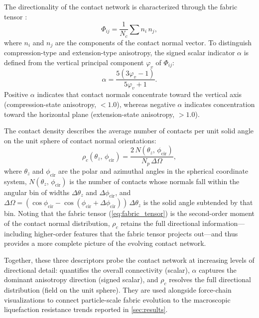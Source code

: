 The directionality of the contact network is characterized through the fabric tensor \citep{Oda1982fabric,Oda1982stat}:
\begin{equation}
\Phi_{ij} = \frac{1}{N_c}\sum n_i\,n_j,
\label{eq:fabric_tensor}
\end{equation}
where $n_i$ and $n_j$ are the components of the contact normal vector. To distinguish compression-type and extension-type anisotropy, the signed scalar indicator $\alpha$ \citep{YimsiriSoga2010,Otsubo2022} is defined from the vertical principal component $\varphi_v$ of $\Phi_{ij}$:
\begin{equation}
\alpha = \frac{5(3\varphi_v - 1)}{5\varphi_v + 1}.
\label{eq:alpha_definition_method}
\end{equation}
Positive $\alpha$ indicates that contact normals concentrate toward the vertical axis (compression-state anisotropy, \Kzero{} $< 1.0$), whereas negative $\alpha$ indicates concentration toward the horizontal plane (extension-state anisotropy, \Kzero{} $> 1.0$).

The contact density \citep{Han2023} describes the average number of contacts per unit solid angle on the unit sphere of contact normal orientations:
\begin{equation}
\rho_c(\theta_z,\,\phi_{\mathrm{cir}}) = \frac{2\,N(\theta_z,\,\phi_{\mathrm{cir}})}{N_p\,\Delta\Omega},
\label{eq:contact_density}
\end{equation}
where $\theta_z$ and $\phi_{\mathrm{cir}}$ are the polar and azimuthal angles in the spherical coordinate system, $N(\theta_z,\,\phi_{\mathrm{cir}})$ is the number of contacts whose normals fall within the angular bin of widths $\Delta\theta_z$ and $\Delta\phi_{\mathrm{cir}}$, and $\Delta\Omega = (\cos\phi_{\mathrm{cir}} - \cos(\phi_{\mathrm{cir}}+\Delta\phi_{\mathrm{cir}}))\,\Delta\theta_z$ is the solid angle subtended by that bin. Noting that the fabric tensor (\cref{eq:fabric_tensor}) is the second-order moment of the contact normal distribution, $\rho_c$ retains the full directional information---including higher-order features that the fabric tensor projects out---and thus provides a more complete picture of the evolving contact network.

Together, these three descriptors probe the contact network at increasing levels of directional detail: \Zm{} quantifies the overall connectivity (scalar), $\alpha$ captures the dominant anisotropy direction (signed scalar), and $\rho_c$ resolves the full directional distribution (field on the unit sphere). They are used alongside force-chain visualizations to connect particle-scale fabric evolution to the macroscopic liquefaction resistance trends reported in \cref{sec:results}.
